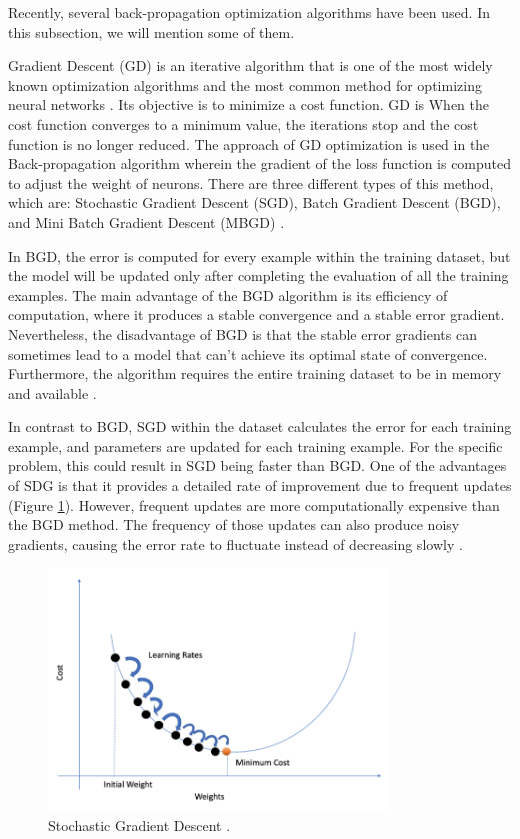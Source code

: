 \documentclass[12pt]{diazessay}
\newcounter{subsubsubsection}[subsubsection]
\begin{document}
    \hspace{0.7cm}Recently, several back-propagation optimization algorithms have been used. In this subsection, we will mention some of them.

    \hspace{0.7cm} Gradient Descent (GD) is an iterative algorithm that is one of the most widely known optimization algorithms and the most common method for optimizing neural networks \cite{ray2019quick} \cite{ruder2016overview}. Its objective is to minimize a cost function. GD is  When the cost function converges to a minimum value, the iterations stop and the cost function is no longer reduced. The approach of GD optimization is used in the Back-propagation algorithm wherein the gradient of the loss function is computed to adjust the weight of neurons. There are three different types of this method, which are: Stochastic Gradient Descent (SGD), Batch Gradient Descent (BGD), and Mini Batch Gradient Descent (MBGD) \cite{ray2019quick}.

    In BGD, the error is computed for every example within the training dataset, but the model will be updated only after completing the evaluation of all the training examples. The main advantage of the BGD algorithm is its efficiency of computation, where it produces a stable convergence and a stable error gradient. Nevertheless, the disadvantage of BGD is that the stable error gradients can sometimes lead to a model that can't achieve its optimal state of convergence. Furthermore, the algorithm requires the entire training dataset to be in memory and available \cite{ray2019quick}. 

    In contrast to BGD, SGD within the dataset calculates the error for each training example, and parameters are updated for each training example. For the specific problem, this could result in SGD being faster than BGD. 
    One of the advantages of SDG is that it provides a detailed rate of improvement due to frequent updates (Figure \ref{fig:stoch}).
    However, frequent updates are more computationally expensive than the BGD method. The frequency of those updates can also produce noisy gradients, causing the error rate to fluctuate instead of decreasing slowly \cite{ray2019quick}. 
    \begin{figure}[H]
        \centering
        \includegraphics[width=9cm]{Figures/stoch.PNG}
        \caption[Stochastic Gradient Descent]{Stochastic Gradient Descent \cite{ghosh2020empirical}.}
        \label{fig:stoch}
    \end{figure}
\end{document}

